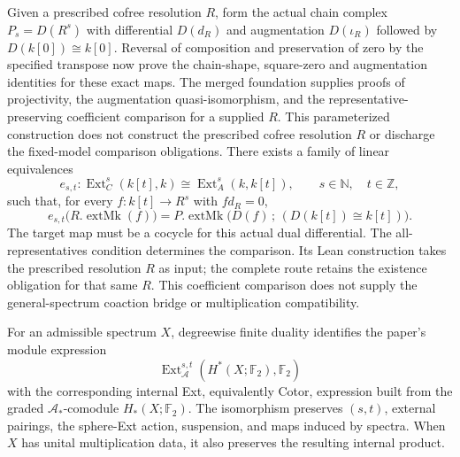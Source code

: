 \begin{theorem}
  \label{thm:milnor-coefficient-module-comparison}
  \notready
  Given a prescribed cofree resolution $R$, form the actual chain complex
  $P_s=D(R^s)$ with differential $D(d_R)$ and augmentation $D(\iota_R)$
  followed by $D(k[0])\cong k[0]$. Reversal of composition and preservation
  of zero by the specified transpose now prove the chain-shape, square-zero
  and augmentation identities for these exact maps. The merged foundation
  supplies proofs of projectivity, the augmentation quasi-isomorphism, and
  the representative-preserving coefficient comparison for a supplied $R$.
  This parameterized construction does not construct the prescribed cofree
  resolution $R$ or discharge the fixed-model comparison obligations.
  There exists a family of linear equivalences
  \[
    e_{s,t}:\operatorname{Ext}_C^s(k[t],k)
       \cong\operatorname{Ext}_A^s(k,k[t]),
    \qquad s\in\mathbb N,\quad t\in\mathbb Z,
  \]
  such that, for every $f:k[t]\to R^s$ with $fd_R=0$,
  \[
    e_{s,t}\bigl(R.\operatorname{extMk}(f)\bigr)
      =P.\operatorname{extMk}\bigl(D(f)\,;\,(D(k[t])\cong k[t])\bigr).
  \]
  The target map must be a cocycle for this actual dual differential.
  The all-representatives condition determines the comparison. Its Lean
  construction takes the prescribed resolution $R$ as input; the complete
  route retains the existence obligation for that same $R$.
  This coefficient comparison does not
  supply the general-spectrum coaction bridge or
  multiplication compatibility.
\end{theorem}

\begin{proposition}
  \label{prop:adams-module-comodule-ext-comparison}
  \notready
  For an admissible spectrum $X$, degreewise finite duality identifies the
  paper's module expression
  \[
    \operatorname{Ext}_{\mathcal A}^{s,t}
      (H^*(X;\mathbb F_2),\mathbb F_2)
  \]
  with the corresponding internal Ext, equivalently Cotor, expression built
  from the graded $\mathcal A_*$-comodule $H_*(X;\mathbb F_2)$.  The
  isomorphism preserves $(s,t)$, external pairings, the sphere-Ext action,
  suspension, and maps induced by spectra.  When $X$ has unital multiplication
  data, it also preserves the resulting internal product.
\end{proposition}

